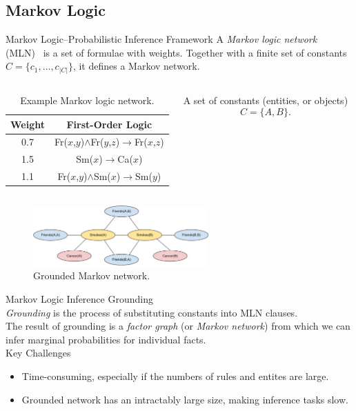 \documentclass[onlymath,xcolor=pdftex,dvipsnames,table]{beamer}
\let\oldemph\emph
\renewcommand{\emph}[1]{{\color{Blue}\oldemph{#1}}}
\newcommand{\head}[1]{{\large\color{OliveGreen}#1\\[2pt]}}
\begin{document}
\subsection{Markov Logic}
\begin{frame}{Markov Logic--Probabilistic Inference Framework}
A \emph{Markov logic network} (MLN)~\cite{richardson2006markov} is a set of formulae with weights. Together with a finite set of constants $C=\{c_1,\ldots,c_{\left\vert C\right\vert}\}$, it defines a Markov network.

\begin{columns}[c]
  \begin{table}\tiny
    \centering
    \begin{tabular}{cc}\toprule
      \textbf{Weight} & \textbf{First-Order Logic}\\\midrule
      0.7 & Fr($x$,$y$)$\wedge$Fr($y$,$z$)$\rightarrow$Fr($x$,$z$)\\
      1.5 & Sm($x$)$\rightarrow$Ca($x$)\\
      1.1 & Fr($x$,$y$)$\wedge$Sm($x$)$\rightarrow$Sm($y$)\\
      \bottomrule
    \end{tabular}
    \caption{Example Markov logic network.}
    \label{tab:mln}
  \end{table}

  A set of constants (entities, or objects) $$C=\{A,B\}.$$
\end{columns}\vspace{-25pt}
\begin{figure}
  \centering
  \includegraphics[width=0.6\textwidth]{mrf.pdf}
  \caption{Grounded Markov network.}
  \label{fig:ground}
\end{figure}
\end{frame}


\begin{frame}{Markov Logic Inference}
\head{Grounding}
\emph{Grounding} is the process of substituting constants into MLN clauses.\\[5pt]

The result of grounding is a \emph{factor graph} (or \emph{Markov network}) from which we can infer marginal probabilities for individual facts.\\[15pt]

\head{Key Challenges}
\begin{itemize}
  \item Time-consuming, especially if the numbers of rules and entites are large.
  \item Grounded network has an intractably large size, making inference tasks slow.
\end{itemize}
\end{frame}
\end{document}
